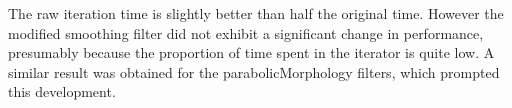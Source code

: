 \documentclass{InsightArticle}
\begin{document}
The raw iteration time is slightly better than half the original
time. However the modified smoothing filter did not exhibit a
significant change in performance, presumably because the proportion
of time spent in the iterator is quite low. A similar result was
obtained for the parabolicMorphology filters, which prompted this
development.

\appendix





\nocite{ITKSoftwareGuide}
\end{document}
